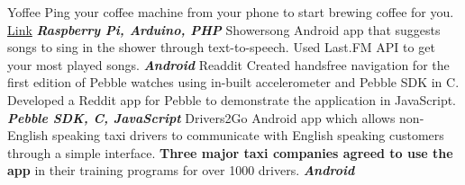 \begin{cvskills}
  \cvskill
    {Yoffee}
    {
	Ping your coffee machine from your  phone to start brewing coffee for you. \href{https://hackmit2014.devpost.com/submissions/27781-yoffee}{Link} \textit{\textbf{Raspberry Pi, Arduino, PHP}}
    }
\cvskill
    {Showersong}
    {
	Android app that suggests songs to sing in the shower through text-to-speech. Used Last.FM API to get your
}
\cvskill
{}
{
 most played songs. \textit{\textbf{Android}}
    }
 \cvskill
    {Readdit}
    {
       Created handsfree navigation for the first edition of Pebble watches using in-built accelerometer and Pebble SDK
}
\cvskill
{}
{
 in C. Developed a Reddit app for Pebble to demonstrate the application in JavaScript. \textit{\textbf{Pebble SDK, C, JavaScript}}
    }
  \cvskill
    {Drivers2Go}
    { 
        Android app which allows non-English speaking taxi drivers to communicate with English speaking customers
}
\cvskill
{}
{
  through a simple interface. \textbf{Three major taxi companies agreed to use the app} in their training programs for over
    }
\cvskill
{}
{
1000 drivers.  \textit{\textbf{Android}}      
}
\end{cvskills}
